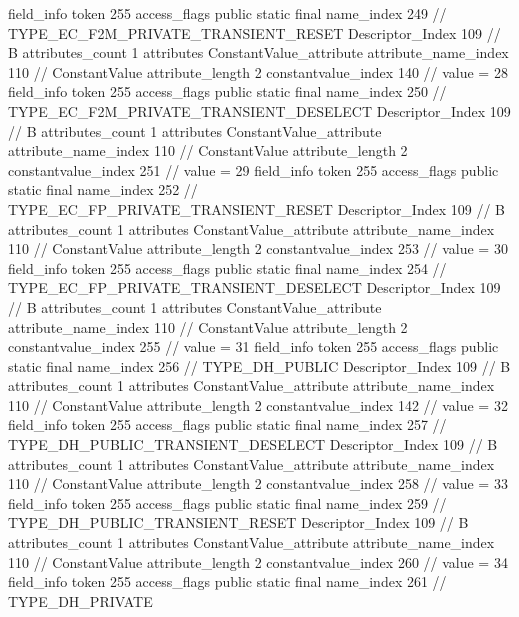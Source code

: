 {{{{{{{				}
				}
			}
			field_info {
				token	255
				access_flags	public static final
				name_index	249		// TYPE_EC_F2M_PRIVATE_TRANSIENT_RESET
				Descriptor_Index	109		// B
				attributes_count	1
				attributes {
				ConstantValue_attribute {
					attribute_name_index	110		// ConstantValue
					attribute_length	2
					constantvalue_index	140		// value = 28
				}
				}
			}
			field_info {
				token	255
				access_flags	public static final
				name_index	250		// TYPE_EC_F2M_PRIVATE_TRANSIENT_DESELECT
				Descriptor_Index	109		// B
				attributes_count	1
				attributes {
				ConstantValue_attribute {
					attribute_name_index	110		// ConstantValue
					attribute_length	2
					constantvalue_index	251		// value = 29
				}
				}
			}
			field_info {
				token	255
				access_flags	public static final
				name_index	252		// TYPE_EC_FP_PRIVATE_TRANSIENT_RESET
				Descriptor_Index	109		// B
				attributes_count	1
				attributes {
				ConstantValue_attribute {
					attribute_name_index	110		// ConstantValue
					attribute_length	2
					constantvalue_index	253		// value = 30
				}
				}
			}
			field_info {
				token	255
				access_flags	public static final
				name_index	254		// TYPE_EC_FP_PRIVATE_TRANSIENT_DESELECT
				Descriptor_Index	109		// B
				attributes_count	1
				attributes {
				ConstantValue_attribute {
					attribute_name_index	110		// ConstantValue
					attribute_length	2
					constantvalue_index	255		// value = 31
				}
				}
			}
			field_info {
				token	255
				access_flags	public static final
				name_index	256		// TYPE_DH_PUBLIC
				Descriptor_Index	109		// B
				attributes_count	1
				attributes {
				ConstantValue_attribute {
					attribute_name_index	110		// ConstantValue
					attribute_length	2
					constantvalue_index	142		// value = 32
				}
				}
			}
			field_info {
				token	255
				access_flags	public static final
				name_index	257		// TYPE_DH_PUBLIC_TRANSIENT_DESELECT
				Descriptor_Index	109		// B
				attributes_count	1
				attributes {
				ConstantValue_attribute {
					attribute_name_index	110		// ConstantValue
					attribute_length	2
					constantvalue_index	258		// value = 33
				}
				}
			}
			field_info {
				token	255
				access_flags	public static final
				name_index	259		// TYPE_DH_PUBLIC_TRANSIENT_RESET
				Descriptor_Index	109		// B
				attributes_count	1
				attributes {
				ConstantValue_attribute {
					attribute_name_index	110		// ConstantValue
					attribute_length	2
					constantvalue_index	260		// value = 34
				}
				}
			}
			field_info {
				token	255
				access_flags	public static final
				name_index	261		// TYPE_DH_PRIVATE
}}}}}
